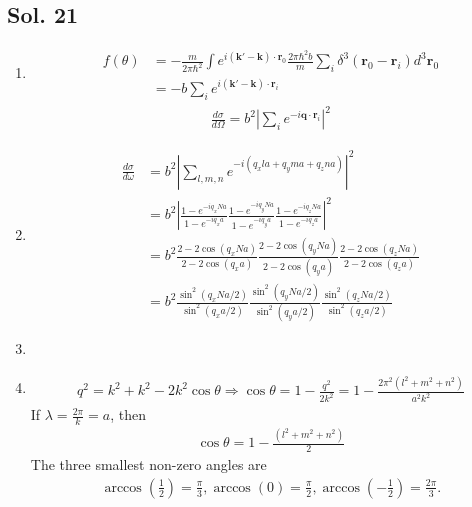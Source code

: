 \subsection*{Sol. 21}
\begin{enumerate}
    \item
          \begin{align*}
              f(\theta) & = -\frac{m}{2\pi\hbar^2}
              \int e^{i(\bm k' - \bm k)\cdot \bm r_0} \frac{2\pi\hbar^2 b}{m}
              \sum_i\delta^3(\bm r_0- \bm r_i)
              d^3\bm r_0 \\
                        & =
              -b
              \sum_i
              e^{i(\bm k' - \bm k)\cdot \bm r_i}
          \end{align*}
          \begin{align*}
              \frac{d\sigma}{d\Omega}
              =
              b^2
              \left|
              \sum_i
              e^{-i\bm q\cdot \bm r_i}
              \right|^2
          \end{align*}
    \item
          \begin{align*}
              \frac{d\sigma}{d\omega}
               & =b^2
              \left|
              \sum_{l,m,n}
              e^{-i(q_xla + q_yma + q_zna)}
              \right|^2 \\
               & =b^2
              \left|
              \frac{1-e^{-iq_xNa}}{1-e^{-iq_xa}}
              \frac{1-e^{-iq_yNa}}{1-e^{-iq_ya}}
              \frac{1-e^{-iq_zNa}}{1-e^{-iq_za}}
              \right|^2 \\
               & =b^2
              \frac{2-2\cos(q_xNa)}{2-2\cos(q_xa)}
              \frac{2-2\cos(q_yNa)}{2-2\cos(q_ya)}
              \frac{2-2\cos(q_zNa)}{2-2\cos(q_za)} \\
               & =b^2
              \frac{\sin^2(q_xNa/2)}{\sin^2(q_xa/2)}
              \frac{\sin^2(q_yNa/2)}{\sin^2(q_ya/2)}
              \frac{\sin^2(q_zNa/2)}{\sin^2(q_za/2)}
          \end{align*}
    \item
    \item
          \begin{align*}
              q^2 = k^2+k^2-2k^2\cos\theta
              \Rightarrow
              \cos\theta  = 1 - \frac{q^2}{2k^2}
              =1-\frac{2\pi^2(l^2+m^2 + n^2)}{a^2k^2}
          \end{align*}
          If $\lambda = \frac{2\pi}{k}=a$, then
          \begin{align*}
              \cos\theta  = 1-\frac{(l^2+m^2 + n^2)}{2}
          \end{align*}
          The three smallest non-zero angles are
          \begin{align*}
              \arccos(\frac{1}{2}) = \frac{\pi}{3},
              \arccos(0) = \frac{\pi}{2},
              \arccos(-\frac{1}{2}) = \frac{2\pi}{3}.
          \end{align*}
\end{enumerate}

